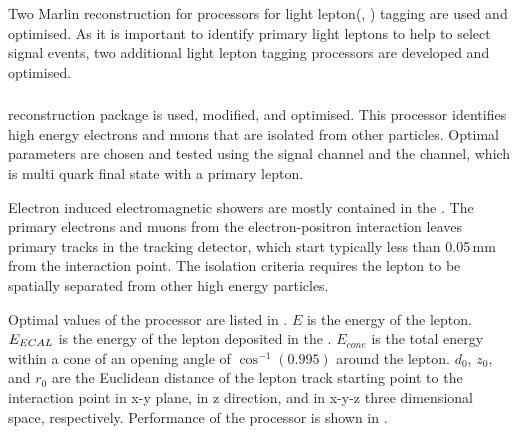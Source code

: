 Two Marlin reconstruction for processors for light lepton(\Pe, \Pmu) tagging are used and optimised. As it is important to identify primary light leptons to help to select signal events, two additional light lepton tagging processors are developed and optimised.


\subsubsection{\IsolatedLeptonFinderProcessor}
\label{sec:doubleHiggsIsolatedLeptonFinder}
\IsolatedLeptonFinderProcessor reconstruction package is used, modified, and optimised. This processor identifies high energy electrons and muons that are isolated from other particles. Optimal parameters are chosen and tested using the signal channel and the \eeTo{ \Pquark \Pquark \Pquark \Pquark \Plepton \Pnu} channel, which is multi quark final state with a primary lepton.

Electron induced electromagnetic showers are mostly contained in the \ECAL. The primary electrons and muons from the electron-positron interaction leaves primary tracks in the tracking detector, which start typically less than 0.05\,mm from the interaction point. The isolation criteria requires the lepton to be spatially separated from other high energy particles. 

Optimal values of the processor are listed in . $E$ is the energy of the lepton. $E_{ECAL}$ is the energy of the lepton deposited in the \ECAL. $E_{cone}$ is the total energy within a cone of an opening angle of $\cos^{-1}(0.995)$ around the lepton. $d_0$, $z_0$, and $r_0$ are the Euclidean distance of the lepton track starting point to the interaction point in x-y plane, in z direction, and in x-y-z three dimensional space, respectively. Performance of the processor is shown in .

